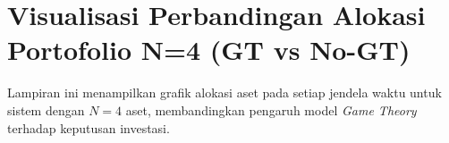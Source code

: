 \chapter{Visualisasi Perbandingan Alokasi Portofolio N=4 (GT vs No-GT)}
\label{appendix:window_analysis_n4}

Lampiran ini menampilkan grafik alokasi aset pada setiap jendela waktu untuk sistem dengan $N=4$ aset, membandingkan pengaruh model \textit{Game Theory} terhadap keputusan investasi.

%         
% 
% 
%         
% 
% 

%         
% 
% 
%         
% 
% 

